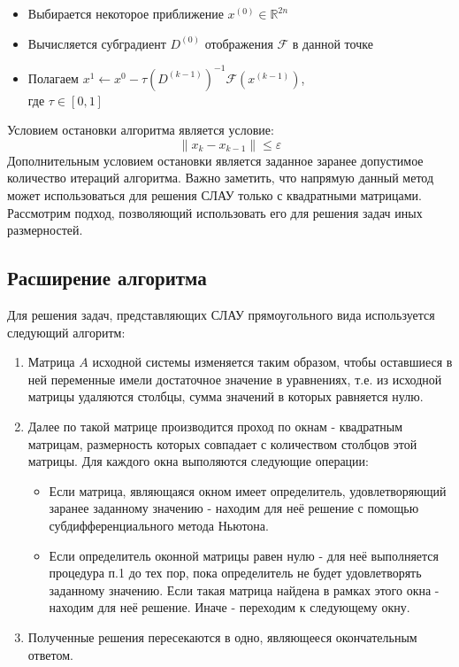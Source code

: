 \documentclass{article}
\begin{document}
\begin{itemize}
  \item Выбирается некоторое приближение $x^{(0)} \in \mathbb{R}^{2n}$
  \item Вычисляется субградиент $D^{(0)}$ отображения $\mathcal{F}$ в данной точке
  \item Полагаем $x^{1} \leftarrow x^{0} - \tau(D^{(k-1)})^{-1}\mathcal{F}(x^{(k-1)})$, \\
  где $\tau \in [0,1]$
\end{itemize}

Условием остановки алгоритма является условие:
\begin{equation}
 \|x_k - x_{k-1}\| \leq \varepsilon
\end{equation}
Дополнительным условием остановки является заданное заранее допустимое количество итераций алгоритма.
Важно заметить, что напрямую данный метод может использоваться для решения СЛАУ только с квадратными матрицами. Рассмотрим подход, позволяющий использовать его для решения задач иных размерностей.

\subsection{Расширение алгоритма}

Для решения задач, представляющих СЛАУ прямоугольного вида используется следующий алгоритм: 

\begin{enumerate} 
  \item Матрица $A$ исходной системы изменяется таким образом, чтобы оставшиеся в ней переменные имели достаточное значение в уравнениях, т.е. из исходной матрицы удаляются столбцы, сумма значений в которых равняется нулю.
  \item Далее по такой матрице производится проход по окнам - квадратным матрицам, размерность которых совпадает с количеством столбцов этой матрицы. Для каждого окна выполяются следующие операции:
  \begin{itemize}
  \item Если матрица, являющаяся окном имеет определитель, удовлетворяющий заранее заданному значению - находим для неё решение с помощью субдифференциального метода Ньютона.
  \item Если определитель оконной матрицы равен нулю - для неё выполняется процедура п.1 до тех пор, пока определитель не будет удовлетворять заданному значению. Если такая матрица найдена в рамках этого окна - находим для неё решение. Иначе - переходим к следующему окну.
  \end{itemize}
  \item Полученные решения пересекаются в одно, являющееся окончательным ответом.
  \end{enumerate}
\end{document}
